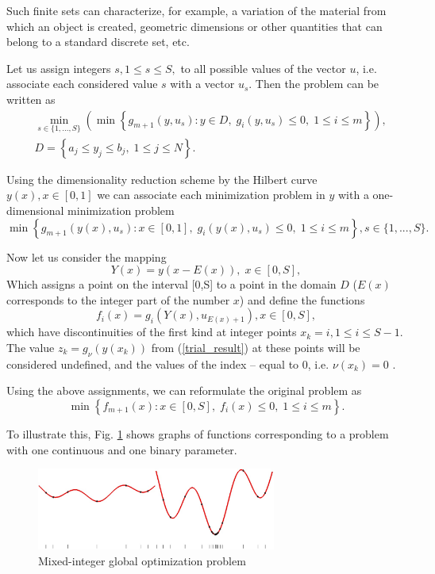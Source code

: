 \documentclass[
11pt,%
tightenlines,%
twoside,%
onecolumn,%
nofloats,%
nobibnotes,%
nofootinbib,%
superscriptaddress,%
noshowpacs,%
centertags]%
{revtex4}
\begin{document}
Such finite sets can characterize, for example, a variation of the material from which an object is created, geometric dimensions or other quantities that can belong to a standard discrete set, etc.


Let us assign integers  $s, 1\leq s \leq S,$ to all possible values of the vector $u$, i.e. associate each considered value $s$ with a vector $u_s$. 
Then the problem can be written as
\begin{eqnarray}\label{problem_is}
& \min_{s\in\{1,...,S\}}\left(\min{\left\{ g_{m+1}(y,u_s):y\in D, \; g_i(y,u_s)\leq 0, \; 1 \leq i \leq m\right\}}\right),\\
& D=\left\{ a_j\leq y_j \leq b_j, \; 1 \leq j\leq N \right\}.\nonumber 
\end{eqnarray}

Using the dimensionality reduction scheme by the Hilbert curve $y(x), x\in [0,1]$ we can associate each minimization problem in $y$ with a one-dimensional minimization problem
\[
 \min{\left\{ g_{m+1}(y(x),u_s):x \in [0,1], \; g_i(y(x),u_s)\leq 0, \; 1 \leq i \leq m\right\}}, s\in\{1,...,S\}.
\]

Now let us consider the mapping
\[
Y(x)=y(x-E(x)), \; x\in[0,S],
\]
Which assigns a point on the interval  [0,S] to a point in the domain $D$ ($E(x)$ corresponds to the integer part of the number $x$) and define the functions 
\[
f_i(x) = g_i(Y(x),u_{E(x)+1}), x\in[0,S],
\]
which have discontinuities of the first kind at integer points $x_k = i, 1\leq i \leq S-1$.
The value  $z_k = g_\nu(y(x_k))$ from (\ref{trial_result}) at these points will be considered undefined, and the values of the index -- equal to 0, i.e.  $\nu(x_k) = 0$ .

Using the above assignments, we can reformulate the original problem as
\begin{equation}\label{problem_is1}
\min \left\{f_{m+1}(x): x \in [0,S], \; f_i(x) \leq 0, \; 1 \leq i \leq m\right\}.
\end{equation}

To illustrate this, Fig. \ref{fig:1} shows graphs of functions corresponding to a problem with one continuous and one binary parameter.
\begin{figure}[ht]
    \centering
    \includegraphics[width=0.7\textwidth]{fig1.jpg}
    \caption{Mixed-integer global optimization problem}
    \label{fig:1}
\end{figure}
\end{document}
